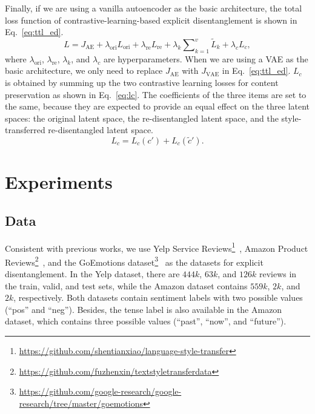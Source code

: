 \documentclass[11pt,a4paper]{article}
\renewcommand{\cite}{\citep}
\begin{document}
Finally, if we are using a vanilla autoencoder as the basic architecture, the total loss function of contrastive-learning-based explicit disentanglement is shown in Eq.~\eqref{eq:ttl_ed}.
\begin{equation}\label{eq:ttl_ed}
    L=J_\text{AE}+\lambda_\text{ori}L_\text{ori} +\lambda_\text{re}L_\text{re} + \lambda_{k}\sum\nolimits_{k=1}^v\tilde L_k + \lambda_cL_c,
\end{equation}
where $\lambda_\text{ori}$, $\lambda_\text{re}$, $\lambda_{k}$, and $\lambda_c$ are hyperparameters. When we are using a VAE as the basic architecture, we only need to replace $J_\text{AE}$ with $J_\text{VAE}$ in Eq.~\eqref{eq:ttl_ed}. $L_c$ is obtained by summing up the two contrastive learning losses for content preservation as shown in Eq.~\eqref{eq:lc}. The coefficients of the three items are set to the same, because they are expected to provide an equal effect on the three latent spaces: the original latent space, the re-disentangled latent space, and the style-transferred 
re-disentangled latent space.
\begin{equation}\label{eq:lc}
L_c = L_c(c') + L_c(\tilde c').%
\end{equation}




\section{Experiments}



\subsection{Data}

Consistent with previous works, we use Yelp Service Reviews\footnote{\url{https://github.com/shentianxiao/language-style-transfer}}~\cite{Shen2017Style}, Amazon
Product Reviews\footnote{\url{https://github.com/fuzhenxin/textstyletransferdata}}~\cite{Fu2018Style}, and the GoEmotions dataset\footnote{\url{https://github.com/google-research/google-research/tree/master/goemotions}}~\cite{demszky2020goemotions} as the datasets for explicit disentanglement. In the Yelp dataset, there are $444k$, $63k$, and $126k$ reviews in the train, valid, and test sets, while the Amazon dataset contains $559k$, $2k$, and $2k$, respectively. Both datasets contain sentiment labels with two possible values (``pos'' and ``neg''). Besides, the tense label is also available in the Amazon dataset,  which contains three possible values (``past'', ``now'', and ``future''). 
\end{document}
